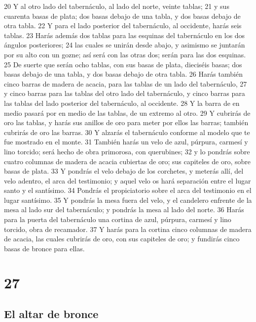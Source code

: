 20 Y al otro lado del tabernáculo, al lado del norte, veinte tablas;
21 y sus cuarenta basas de plata; dos basas debajo de una tabla, y dos basas debajo de otra tabla.
22 Y para el lado posterior del tabernáculo, al occidente, harás seis tablas.
23 Harás además dos tablas para las esquinas del tabernáculo en los dos ángulos posteriores;
24 las cuales se unirán desde abajo, y asimismo se juntarán por su alto con un gozne; así será con las otras dos; serán para las dos esquinas.
25 De suerte que serán ocho tablas, con sus basas de plata, dieciséis basas; dos basas debajo de una tabla, y dos basas debajo de otra tabla.
26 Harás también cinco barras de madera de acacia, para las tablas de un lado del tabernáculo,
27 y cinco barras para las tablas del otro lado del tabernáculo, y cinco barras para las tablas del lado posterior del tabernáculo, al occidente.
28 Y la barra de en medio pasará por en medio de las tablas, de un extremo al otro.
29 Y cubrirás de oro las tablas, y harás sus anillos de oro para meter por ellos las barras; también cubrirás de oro las barras.
30 Y alzarás el tabernáculo conforme al modelo que te fue mostrado en el monte.
31 También harás un velo de azul, púrpura, carmesí y lino torcido; será hecho de obra primorosa, con querubines;
32 y lo pondrás sobre cuatro columnas de madera de acacia cubiertas de oro; sus capiteles de oro, sobre basas de plata.
33 Y pondrás el velo debajo de los corchetes, y meterás allí, del velo adentro, el arca del testimonio; y aquel velo os hará separación entre el lugar santo y el santísimo.
34 Pondrás el propiciatorio sobre el arca del testimonio en el lugar santísimo.
35 Y pondrás la mesa fuera del velo, y el candelero enfrente de la mesa al lado sur del tabernáculo; y pondrás la mesa al lado del norte.
36 Harás para la puerta del tabernáculo una cortina de azul, púrpura, carmesí y lino torcido, obra de recamador.
37 Y harás para la cortina cinco columnas de madera de acacia, las cuales cubrirás de oro, con sus capiteles de oro; y fundirás cinco basas de bronce para ellas.

\chapter{27}

\section{El altar de bronce}

